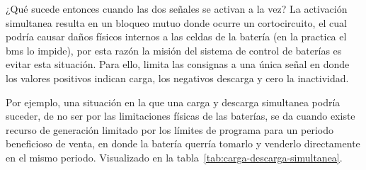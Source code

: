 ¿Qué sucede entonces cuando las dos señales se activan a la vez? La activación simultanea resulta en un bloqueo mutuo donde ocurre un cortocircuito, el cual podría causar daños físicos internos a las celdas de la batería (en la practica el \gls{bms} lo impide), por esta razón la misión del sistema de control de baterías es evitar esta situación. Para ello, limita las consignas a una única señal en donde los valores positivos indican carga, los negativos descarga y cero la inactividad.

Por ejemplo, una situación en la que una carga y descarga simultanea podría suceder, de no ser por las limitaciones físicas de las baterías, se da cuando existe recurso de generación limitado por los límites de programa para un periodo beneficioso de venta, en donde la batería querría tomarlo y venderlo directamente en el mismo periodo. Visualizado en la tabla~\ref{tab:carga-descarga-simultanea}.

